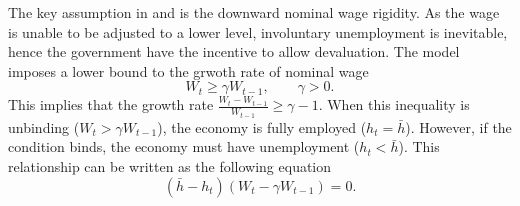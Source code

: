 The key assumption in \citet*{Schmitt-Uribe-16} and \citet*{Na-18} is the downward nominal wage rigidity.
As the wage is unable to be adjusted to a lower level, involuntary unemployment is inevitable, hence the government have the incentive to allow devaluation. The model imposes a lower bound to the grwoth rate of nominal wage
\begin{equation}
    W_t \ge \gamma W_{t-1}, \qquad \gamma > 0.
\end{equation}
This implies that the growth rate $\frac{W_{t} - W_{t-1}}{W_{t-1}} \ge \gamma - 1$. When this inequality is unbinding ($W_t > \gamma W_{t-1}$), the economy is fully employed ($h_t = \bar{h}$). However, if the condition binds, the economy must have unemployment ($h_t < \bar{h}$). This relationship can be written as the following equation
\begin{equation}
    \label{eq:wage-rigid}
    (\bar{h} - h_t)(W_t - \gamma W_{t-1}) = 0.
\end{equation}
